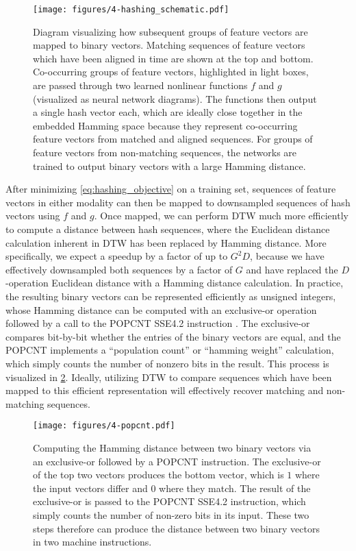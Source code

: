 \begin{figure}
  \texttt{[image: figures/4-hashing\_schematic.pdf]}
  \caption[Hashing groups of subsequent feature vectors]{Diagram visualizing how subsequent groups of feature vectors are mapped to binary vectors.
Matching sequences of feature vectors which have been aligned in time are shown at the top and bottom.
Co-occurring groups of feature vectors, highlighted in light boxes, are passed through two learned nonlinear functions $f$ and $g$ (visualized as neural network diagrams).
The functions then output a single hash vector each, which are ideally close together in the embedded Hamming space because they represent co-occurring feature vectors from matched and aligned sequences.
For groups of feature vectors from non-matching sequences, the networks are trained to output binary vectors with a large Hamming distance.}
  \label{fig:hashing_schematic}
\end{figure}

After minimizing \cref{eq:hashing_objective} on a training set, sequences of feature vectors in either modality can then be mapped to downsampled sequences of hash vectors using $f$ and $g$.
Once mapped, we can perform DTW much more efficiently to compute a distance between hash sequences, where the Euclidean distance calculation inherent in DTW has been replaced by Hamming distance.
More specifically, we expect a speedup by a factor of up to $G^2 D$, because we have effectively downsampled both sequences by a factor of $G$ and have replaced the $D$-operation Euclidean distance with a Hamming distance calculation.
In practice, the resulting binary vectors can be represented efficiently as unsigned integers, whose Hamming distance can be computed with an exclusive-or operation followed by a call to the POPCNT SSE4.2 instruction \cite{intel2007programming}.
The exclusive-or compares bit-by-bit whether the entries of the binary vectors are equal, and the POPCNT implements a ``population count'' or ``hamming weight'' calculation, which simply counts the number of nonzero bits in the result.
This process is visualized in \cref{fig:popcnt}.
Ideally, utilizing DTW to compare sequences which have been mapped to this efficient representation will effectively recover matching and non-matching sequences.

\begin{figure}
  \texttt{[image: figures/4-popcnt.pdf]}
  \caption[Computing Hamming distance with XOR and POPCNT]{Computing the Hamming distance between two binary vectors via an exclusive-or followed by a POPCNT instruction.
The exclusive-or of the top two vectors produces the bottom vector, which is $1$ where the input vectors differ and $0$ where they match.
The result of the exclusive-or is passed to the POPCNT SSE4.2 instruction, which simply counts the number of non-zero bits in its input.
These two steps therefore can produce the distance between two binary vectors in two machine instructions.}
  \label{fig:popcnt}
\end{figure}

